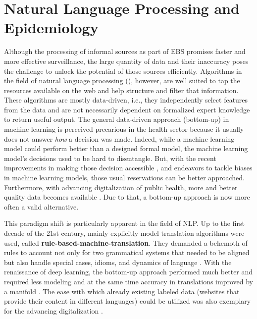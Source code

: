 \section{Natural Language Processing and Epidemiology}
Although the processing of informal sources as part of EBS promises faster and more effective surveillance, the large quantity of data and their inaccuracy poses the challenge to unlock the potential of those sources efficiently.
Algorithms in the field of natural language processing (), however, are well suited to tap the resources available on the web and help structure and filter that information.
These algorithms are mostly data-driven, i.e., they independently select features from the data and are not necessarily dependent on formalized expert knowledge to return useful output.
The general data-driven approach (bottom-up) in machine learning is perceived precarious in the health sector because it usually does not answer \textit{how} a decision was made.
Indeed, while a machine learning model could perform better than a designed formal model, the machine learning model's decisions used to be hard to disentangle.
But, with the recent improvements in making those decision accessible \citep{Arras2017}, and endeavors to tackle biases in machine learning models, those usual reservations can be better approached.
Furthermore, with advancing digitalization of public health, more and better quality data becomes available \citep{DEMIS}.
Due to that, a bottom-up approach is now more often a valid alternative.

This paradigm shift is particularly apparent in the field of NLP.
Up to the first decade of the 21st century, mainly explicitly model translation algorithms were used, called \textbf{rule-based-machine-translation}.
They demanded a behemoth of rules to account not only for two grammatical systems that needed to be aligned but also handle special cases, idioms, and dynamics of language \citep{Bar-Hillel1953, Bar-Hillel1960}.
With the renaissance of deep learning, the bottom-up approach performed much better and required less modeling and at the same time accuracy in translations improved by a manifold \citep{Bengio2003}.
The ease with which already existing labeled data (websites that provide their content in different languages) could be utilized was also exemplary for the advancing digitalization \citep{Macklovitch00}.


